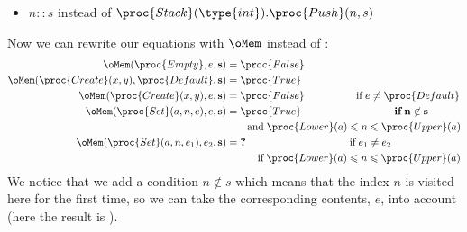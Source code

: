 \begin{itemize}
\begin{itemize}
      \item \(n :: s\) instead of
      \(\proc{Stack}(\type{int}).\proc{Push} (n, s)\)
    \end{itemize}
    Now we can rewrite our equations with \(\oMem\) instead of
    :
    \begin{align*}
        \oMem (\proc{Empty}, e, \mathbf{s})
     &= \proc{False}\\
        \oMem (\proc{Create} (x, y), \proc{Default}, \mathbf{s})
     &= \proc{True}\\
        \oMem (\proc{Create} (x, y), e, \mathbf{s})
     &= \proc{False}
        \qquad\qquad\quad \text{if} \; e \neq \proc{Default}\\
        \oMem (\proc{Set} (a, n, e), e, \mathbf{s})
     &= \proc{True}
       \qquad\qquad\qquad\qquad\quad \textbf{if} \; \mathbf{n \not\in s}\\
     & \qquad \text{and} \; \proc{Lower} (a)
        \leqslant n \leqslant \proc{Upper} (a)\\
        \oMem (\proc{Set} (a, n, e_1), e_2, \mathbf{s})
     &= \textbf{?}
      \qquad\qquad\qquad\qquad\qquad \text{if} \; e_1 \neq e_2\\
     & \qquad\quad \text{if} \; \proc{Lower}
     (a) \leqslant n \leqslant \proc{Upper} (a)
    \end{align*}
    We notice that we add a condition \(n \not\in s\) which means that
    the index \(n\) is visited here for the first time, so we can take
    the corresponding contents, \(e\), into account (here the result
    is ).
   

\end{itemize}
